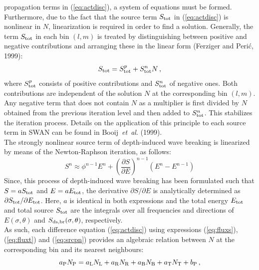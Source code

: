 \documentclass[12pt]{book}
\begin{document}
propagation terms in (\ref{eq:actdisc}), a system of equations must
be formed.
Furthermore, due to the fact that the source term $S_{\rm tot}$ in (\ref{eq:actdisc}) is nonlinear in $N$,
linearization
is required in order to find a solution. Generally, the term $S_{\rm tot}$ in each bin $(l,m)$ is treated by
distinguishing between positive and negative contributions and arranging these in the linear form
(Ferziger and Peri\'{c}, 1999):
\begin{equation}
  S_{\rm tot} = S_{\rm tot}^p + S_{\rm tot}^n N \, ,
  \label{eq:srcpn}
\end{equation}
where $S_{\rm tot}^p$ consists of positive contributions and
$S_{\rm tot}^n$ of negative ones. Both contributions are independent of the solution $N$ at the corresponding bin $(l,m)$.
Any negative term that does not contain $N$ as a multiplier is first
divided by $N$ obtained from the previous iteration level and then added to $S_{\rm tot}^n$.
This stabilizes the iteration process.
Details on the application of this principle to each source term in SWAN can be found in Booij~{\it et~al}. (1999).
\\[2ex]
\noindent
The strongly nonlinear source term of depth-induced wave breaking is linearized by means of the Newton-Raphson iteration,
as follows:
\begin{equation}
  S^n \approx \phi^{n-1} E^{n} + \left( \frac{\partial S}{\partial E} \right)^{n-1} (E^n - E^{n-1})
\end{equation}
Since, this process of depth-induced wave breaking has been formulated such that $S = aS_{\rm tot}$ and $E = aE_{\rm tot}$,
the derivative $\partial S/\partial E$ is analytically determined as $\partial S_{\rm tot}/\partial E_{\rm tot}$. Here,
$a$ is identical in both expressions and the total energy $E_{\rm tot}$ and total source $S_{\rm tot}$ are the integrals
over all frequencies and directions of $E(\sigma,\theta)$ and $S_{\rm {ds,br}}(\sigma,\theta)$, respectively.
\\[2ex]
\noindent
As such, each difference equation (\ref{eq:actdisc}) using expressions (\ref{eq:fluxs}), (\ref{eq:fluxt})
and (\ref{eq:srcpn}) provides
an algebraic relation between $N$ at the corresponding bin and its nearest neighbours:
\begin{equation}
  a_{\rm P} N_{\rm P} = a_{\rm L} N_{\rm L}+
                                a_{\rm R} N_{\rm R}+
                                a_{\rm B} N_{\rm B}+
                                a_{\rm T} N_{\rm T}+
                                b_{\rm P} \, ,
  \label{eq:diffeq}
\end{equation}
\end{document}
